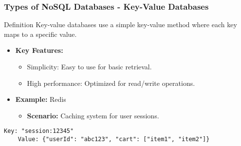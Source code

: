 \documentclass[aspectratio=169]{beamer}
\begin{document}
\begin{frame}[fragile]
    \frametitle{Types of NoSQL Databases - Key-Value Databases}
    \begin{block}{Definition}
        Key-value databases use a simple key-value method where each key maps to a specific value.
    \end{block}

    \begin{itemize}
        \item \textbf{Key Features:}
        \begin{itemize}
            \item Simplicity: Easy to use for basic retrieval.
            \item High performance: Optimized for read/write operations.
        \end{itemize}
        
        \item \textbf{Example:} Redis
        \begin{itemize}
            \item \textbf{Scenario:} Caching system for user sessions.
        \end{itemize}
    \end{itemize}

    \begin{lstlisting}[language=plaintext]
    Key: "session:12345"
    Value: {"userId": "abc123", "cart": ["item1", "item2"]}
    \end{lstlisting}
\end{frame}
\end{document}
